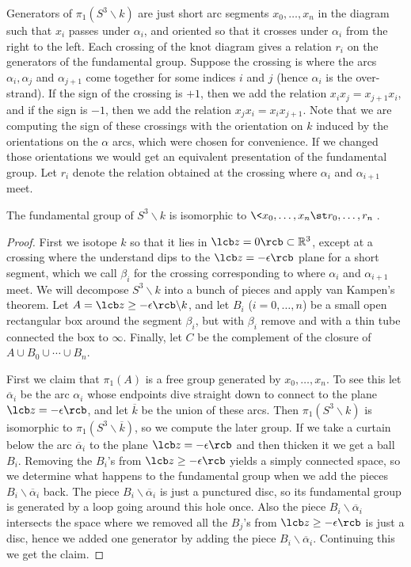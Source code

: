 Generators of $\pi_1(S^3 \backslash k)$ are just short arc segments $x_0,\ldots,x_n$ in the diagram such that $x_i$ passes under $\alpha_i$, and oriented so that it crosses under $\alpha_i$ from the right to the left. Each crossing of the knot diagram gives a relation $r_i$ on the generators of the fundamental group. Suppose the crossing is where the arcs $\alpha_i,\alpha_j$ and $\alpha_{j+1}$ come together for some indices $i$ and $j$ (hence $\alpha_i$ is the over-strand). If the sign of the crossing is $+1$, then we add the relation $x_i x_j = x_{j+1} x_i$, and if the sign is $-1$, then we add the relation $x_j x_i = x_i x_{j+1}$. Note that we are computing the sign of these crossings with the orientation on $k$ induced by the orientations on the $\alpha$ arcs, which were chosen for convenience. If we changed those orientations we would get an equivalent presentation of the fundamental group. Let $r_i$ denote the relation obtained at the crossing where $\alpha_i$ and $\alpha_{i+1}$ meet.
\begin{prop}
The fundamental group of $S^3 \backslash k$ is isomorphic to $\< x_0,\ldots,x_n \st r_0,\ldots,r_n \>$.
\end{prop}
\begin{proof}
First we isotope $k$ so that it lies in $\lcb z = 0 \rcb \subset \mathbb R^3$, except at a crossing where the understand dips to the $\lcb z=-\epsilon \rcb$ plane for a short segment, which we call $\beta_i$ for the crossing corresponding to where $\alpha_i$ and $\alpha_{i+1}$ meet. We will decompose $S^3 \backslash k$ into a bunch of pieces and apply van Kampen's theorem. Let $A = \lcb z \geq -\epsilon \rcb \backslash k$, and let $B_i$ ($i=0,\ldots,n$) be a small open rectangular box around the segment $\beta_i$, but with $\beta_i$ remove and with a thin tube connected the box to $\infty$. Finally, let $C$ be the complement of the closure of $A \cup B_0 \cup \cdots \cup B_n$. 

First we claim that $\pi_1(A)$ is a free group generated by $x_0,\ldots,x_n$. To see this let $\overline{\alpha}_i$ be the arc $\alpha_i$ whose endpoints dive straight down to connect to the plane $\lcb z=-\epsilon \rcb$, and let $\overline{k}$ be the union of these arcs. Then $\pi_1(S^3\backslash k)$ is isomorphic to $\pi_1(S^3 \backslash \overline{k})$, so we compute the later group. If we take a curtain below the arc $\overline{\alpha}_i$ to the plane $\lcb z=-\epsilon \rcb$ and then thicken it we get a ball $B_i$. Removing the $B_i$'s from $\lcb z \geq -\epsilon \rcb$ yields a simply connected space, so we determine what happens to the fundamental group when we add the pieces $B_i \backslash \overline{\alpha}_i$ back. The piece $B_i \backslash \overline{\alpha}_i$ is just a punctured disc, so its fundamental group is generated by a loop going around this hole once. Also the piece $B_i \backslash \overline{\alpha}_i$ intersects the space where we removed all the $B_j$'s from $\lcb z \geq -\epsilon \rcb$ is just a disc, hence we added one generator by adding the piece $B_i \backslash \overline{\alpha}_i$. Continuing this we get the claim.



\unfinished
\end{proof}
